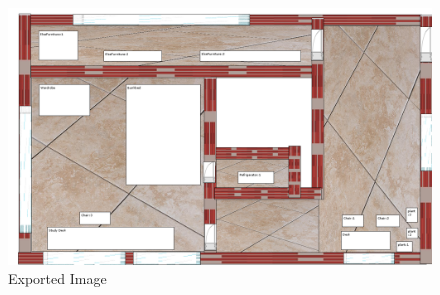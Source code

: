 \begin{figure}[h]
	\includegraphics[keepaspectratio,width=\textwidth]{images/output.png}
	\caption{Exported Image}
\end{figure}
